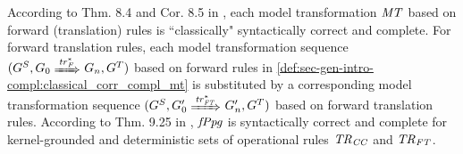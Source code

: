 \begin{remark}
\label{rem:sec-gen-intro-compl:classical_corr_compl_mt}
According to Thm. 8.4 and Cor. 8.5 in \cite{FAGT2}, each model transformation $\mathit{MT}$ based on forward (translation) rules is ``classically" syntactically correct and complete.
For forward translation rules, each model transformation sequence $(G^S,G_0 \Trans{\tr^*_F} G_n,G^T)$ based on forward rules in \cref{def:sec-gen-intro-compl:classical_corr_compl_mt} is substituted by a corresponding model transformation sequence $(G^S,G'_0 \Trans{\tr^*_\FT} G'_n,G^T)$ based on forward translation rules.
According to Thm. 9.25 in \cite{FAGT2}, $\mathit{fPpg}$ is syntactically correct and complete for kernel-grounded and deterministic sets of operational rules $\mathit{TR}_\mathit{CC}$ and $\mathit{TR}_\mathit{FT}$.
\envEndMarker
\end{remark}
